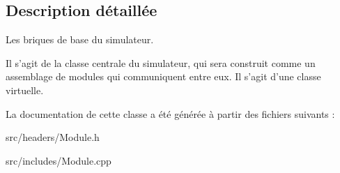 \subsection{Description détaillée}
Les briques de base du simulateur. 

Il s'agit de la classe centrale du simulateur, qui sera construit comme un assemblage de modules qui communiquent entre eux. Il s'agit d'une classe virtuelle. 

La documentation de cette classe a été générée à partir des fichiers suivants \-:\begin{DoxyCompactItemize}
\item 
src/headers/Module.\-h\item 
src/includes/Module.\-cpp\end{DoxyCompactItemize}
